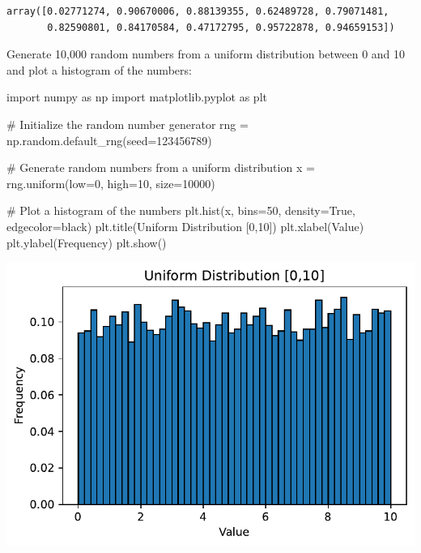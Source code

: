 \documentclass[
  letterpaper,
  DIV=11,
  numbers=noendperiod]{scrreprt}
\newenvironment{Shaded}{\begin{snugshade}}{\end{snugshade}}
\newcommand{\CommentTok}[1]{\textcolor[rgb]{0.37,0.37,0.37}{#1}}
\newcommand{\DecValTok}[1]{\textcolor[rgb]{0.68,0.00,0.00}{#1}}
\newcommand{\ImportTok}[1]{\textcolor[rgb]{0.00,0.46,0.62}{#1}}
\newcommand{\NormalTok}[1]{\textcolor[rgb]{0.00,0.23,0.31}{#1}}
\newcommand{\OperatorTok}[1]{\textcolor[rgb]{0.37,0.37,0.37}{#1}}
\newcommand{\StringTok}[1]{\textcolor[rgb]{0.13,0.47,0.30}{#1}}
\newcommand{\VariableTok}[1]{\textcolor[rgb]{0.07,0.07,0.07}{#1}}
\begin{document}
\begin{verbatim}
array([0.02771274, 0.90670006, 0.88139355, 0.62489728, 0.79071481,
       0.82590801, 0.84170584, 0.47172795, 0.95722878, 0.94659153])
\end{verbatim}

Generate 10,000 random numbers from a uniform distribution between 0 and
10 and plot a histogram of the numbers:

\begin{Shaded}
\begin{Highlighting}[]
\ImportTok{import}\NormalTok{ numpy }\ImportTok{as}\NormalTok{ np}
\ImportTok{import}\NormalTok{ matplotlib.pyplot }\ImportTok{as}\NormalTok{ plt}

\CommentTok{\# Initialize the random number generator}
\NormalTok{rng }\OperatorTok{=}\NormalTok{ np.random.default\_rng(seed}\OperatorTok{=}\DecValTok{123456789}\NormalTok{)}

\CommentTok{\# Generate random numbers from a uniform distribution}
\NormalTok{x }\OperatorTok{=}\NormalTok{ rng.uniform(low}\OperatorTok{=}\DecValTok{0}\NormalTok{, high}\OperatorTok{=}\DecValTok{10}\NormalTok{, size}\OperatorTok{=}\DecValTok{10000}\NormalTok{)}

\CommentTok{\# Plot a histogram of the numbers}
\NormalTok{plt.hist(x, bins}\OperatorTok{=}\DecValTok{50}\NormalTok{, density}\OperatorTok{=}\VariableTok{True}\NormalTok{, edgecolor}\OperatorTok{=}\StringTok{\textquotesingle{}black\textquotesingle{}}\NormalTok{)}
\NormalTok{plt.title(}\StringTok{\textquotesingle{}Uniform Distribution [0,10]\textquotesingle{}}\NormalTok{)}
\NormalTok{plt.xlabel(}\StringTok{\textquotesingle{}Value\textquotesingle{}}\NormalTok{)}
\NormalTok{plt.ylabel(}\StringTok{\textquotesingle{}Frequency\textquotesingle{}}\NormalTok{)}
\NormalTok{plt.show()}
\end{Highlighting}
\end{Shaded}

\includegraphics{006_num_gp_files/figure-pdf/cell-15-output-1.pdf}
\end{document}
